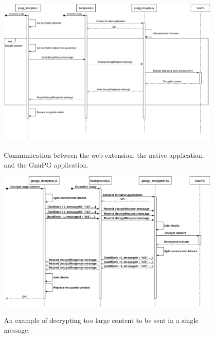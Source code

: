 \begin{figure}[H]
    \begin{center}
        \label{img:gnupg_decryptor-sequence}
        \includegraphics[width=1.3\textwidth,angle=90]{obrazky-figures/sequence-gnupg_decryptor.png}
        \caption{Communication between the web extension, the native application, and the GnuPG application.}
    \end{center}
\end{figure}

\begin{figure}[H]
    \begin{center}
        \label{img:largeContent}
        \includegraphics[width=1.3\textwidth,angle=90]{obrazky-figures/sequence-messageDesign.png}
        \caption{An example of decrypting too large content to be sent in a single message.}
    \end{center}
\end{figure}

